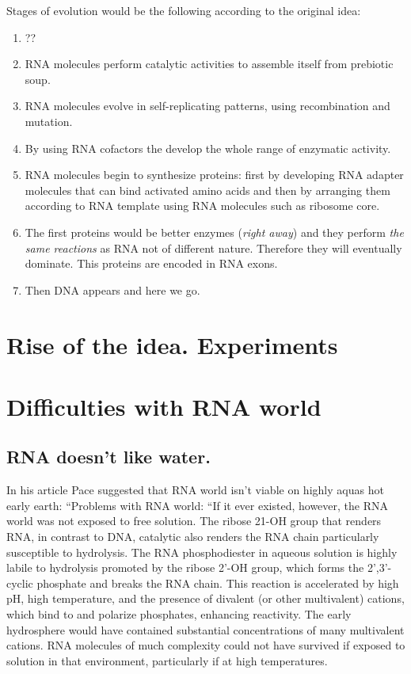 \documentclass[12pt]{paper}
\begin{document}
Stages of evolution would be the following according to the original idea:
\begin{enumerate}
 \item ??
 \item RNA molecules perform catalytic activities to  assemble itself from prebiotic soup.
 \item RNA molecules evolve in self-replicating patterns, using recombination and mutation.
 \item By using RNA cofactors the develop the whole range of enzymatic activity.
 \item RNA molecules begin to synthesize proteins: first by developing RNA adapter molecules that 
can bind activated amino acids and then by arranging them according to RNA template using RNA 
molecules such as ribosome core.
\item The first proteins would be better enzymes (\textit{right away}) and they perform \textit{the 
same reactions} as RNA not of different nature. Therefore they will eventually dominate.
This proteins are encoded in RNA exons.
\item Then DNA appears and here we go.
\end{enumerate}





\section{Rise of the idea. Experiments}

\section{Difficulties with RNA world}
\subsection{RNA doesn't like water.} In his article \cite{Pace1991} Pace suggested that RNA world 
isn't viable on highly aquas hot early earth: ``Problems with RNA world: ``If it ever existed, 
however, the RNA world was not exposed to free solution. The ribose 21-OH group that renders
RNA, in contrast to DNA, catalytic also renders the RNA
chain particularly susceptible to hydrolysis. The RNA
phosphodiester  in aqueous solution is highly labile to hydrolysis promoted by the ribose 2'-OH 
group, which forms the 2',3'-cyclic phosphate and breaks the RNA chain. This
reaction is accelerated by high pH, high temperature, and
the presence of divalent (or other multivalent) cations,
which bind to and polarize phosphates, enhancing reactivity. The early hydrosphere would have 
contained substantial concentrations of many multivalent cations. RNA molecules of much complexity 
could not have survived if exposed to solution in that environment, particularly if at
high temperatures. 
\end{document}
